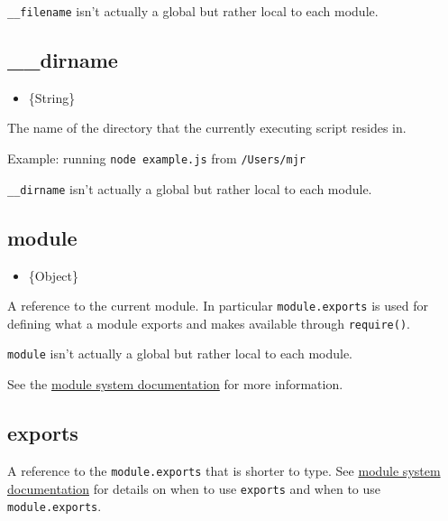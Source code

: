 \texttt{\_\_filename} isn't actually a global but rather local to each
module.

\subsection{\_\_dirname}\label{dirname}

\begin{itemize}
\itemsep1pt\parskip0pt
\item
  \{String\}
\end{itemize}

The name of the directory that the currently executing script resides
in.

Example: running \texttt{node\ example.js} from \texttt{/Users/mjr}

\begin{Shaded}
\begin{Highlighting}[]
\end{Highlighting}
\end{Shaded}

\texttt{\_\_dirname} isn't actually a global but rather local to each
module.

\subsection{module}\label{module}

\begin{itemize}
\itemsep1pt\parskip0pt
\item
  \{Object\}
\end{itemize}

A reference to the current module. In particular \texttt{module.exports}
is used for defining what a module exports and makes available through
\texttt{require()}.

\texttt{module} isn't actually a global but rather local to each module.

See the \href{modules.html}{module system documentation} for more
information.

\subsection{exports}\label{exports}

A reference to the \texttt{module.exports} that is shorter to type. See
\href{modules.html}{module system documentation} for details on when to
use \texttt{exports} and when to use \texttt{module.exports}.

